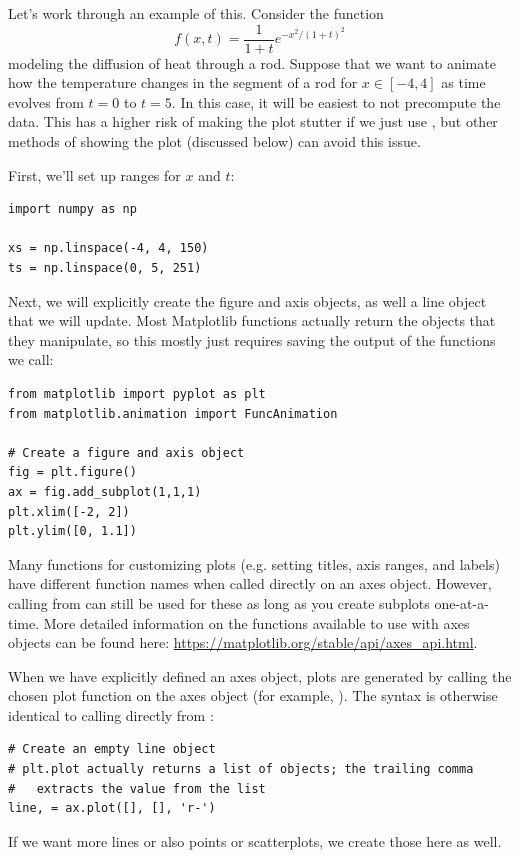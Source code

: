 \noindent
Let's work through an example of this.
Consider the function
\begin{equation*}
f(x,t) = \frac{1}{1+t}e^{-x^2/(1+t)^2}
\end{equation*}
modeling the diffusion of heat through a rod.
Suppose that we want to animate how the temperature changes in the segment of a rod for $x\in [-4,4]$ as time evolves from $t=0$ to $t=5$.
In this case, it will be easiest to not precompute the data.
This has a higher risk of making the plot stutter if we just use , but other methods of showing the plot (discussed below) can avoid this issue.

First, we'll set up ranges for $x$ and $t$:
\begin{lstlisting}
import numpy as np

xs = np.linspace(-4, 4, 150)
ts = np.linspace(0, 5, 251)
\end{lstlisting}

Next, we will explicitly create the figure and axis objects, as well a line object that we will update.
Most Matplotlib functions actually return the objects that they manipulate, so this mostly just requires saving the output of the functions we call:
\begin{lstlisting}
from matplotlib import pyplot as plt
from matplotlib.animation import FuncAnimation

# Create a figure and axis object
fig = plt.figure()
ax = fig.add_subplot(1,1,1)
plt.xlim([-2, 2])
plt.ylim([0, 1.1])
\end{lstlisting}
\begin{info}
Many functions for customizing plots (e.g. setting titles, axis ranges, and labels) have different function names when called directly on an axes object.
However, calling from  can still be used for these as long as you create subplots one-at-a-time.
More detailed information on the functions available to use with axes objects can be found here: \url{https://matplotlib.org/stable/api/axes\_api.html}.
\end{info}
When we have explicitly defined an axes object, plots are generated by calling the chosen plot function on the axes object (for example, ).
The syntax is otherwise identical to calling directly from :
\begin{lstlisting}
# Create an empty line object
# plt.plot actually returns a list of objects; the trailing comma
#   extracts the value from the list
line, = ax.plot([], [], 'r-')
\end{lstlisting}
If we want more lines or also points or scatterplots, we create those here as well.

